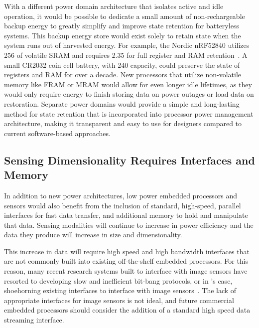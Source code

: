 With a different power domain architecture that isolates active and idle operation, it would be possible to dedicate a small amount of non-rechargeable backup energy to greatly simplify and improve state retention for batteryless systems.
This backup energy store would exist solely to retain state when the system runs out of harvested energy.
For example, the Nordic nRF52840 utilizes 256\ssi{\kilo\byte} of volatile SRAM and requires 2.35\ssi{\micro\watt} for full register and RAM retention~\cite{nrf52840}.
A small CR2032 coin cell battery, with 240\ssi{\milli\Ah} capacity, could preserve the state of registers and RAM for over a decade.
New processors that utilize non-volatile memory like FRAM or MRAM would allow for even longer idle lifetimes, as they would only require energy to finish storing data on power outages or load data on restoration.
Separate power domains would provide a simple and long-lasting method for state retention that is incorporated into processor power management architecture, making it transparent and easy to use for designers compared to current software-based approaches.

\subsection{Sensing Dimensionality Requires Interfaces and Memory}
In addition to new power architectures, low power embedded processors and sensors would also benefit from the inclusion of standard, high-speed, parallel interfaces for fast data transfer, and additional memory to hold and manipulate that data.
Sensing modalities will continue to increase in power efficiency and the data they produce will increase in size and dimensionality.

This increase in data will require high speed and high bandwidth interfaces that are not commonly built into existing off-the-shelf embedded processors.
For this reason, many recent research systems built to interface with image sensors have resorted to developing slow and inefficient bit-bang protocols, or in \namec{}'s case, shoehorning existing interfaces to interface with image sensors~\cite{josephson2019wireless, desai2022camaroptera}.
The lack of appropriate interfaces for image sensors is not ideal, and future commercial embedded processors should consider the addition of a standard high speed data streaming interface.


